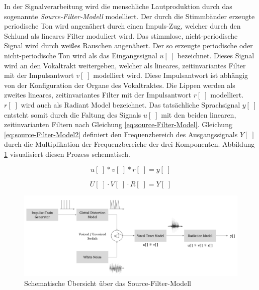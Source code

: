 In der Signalverarbeitung wird die menschliche Lautproduktion durch das sogenannte \emph{Source-Filter-Modell} modelliert. Der durch die Stimmbänder erzeugte periodische Ton wird angenähert durch einen Impuls-Zug, welcher durch den Schlund als lineares Filter moduliert wird. Das stimmlose, nicht-periodische Signal wird durch weißes Rauschen angenähert. Der so erzeugte periodische oder nicht-periodische Ton wird als das Eingangssignal $u[\;]$ bezeichnet. Dieses Signal wird an den Vokaltrakt weitergeben, welcher als lineares, zeitinvariantes Filter mit der Impulsantwort $v[\;]$ modelliert wird. Diese Impulsantwort ist abhängig von der Konfiguration der Organe des Vokaltraktes. Die Lippen werden als zweites lineares, zeitinvariantes Filter mit der Impulsantwort $r[\;]$ modelliert. $r[\;]$ wird auch als \glqq Radiant Model\grqq{} bezeichnet. Das tatsächliche Sprachsignal $y[\;]$ entsteht somit durch die Faltung des Signals $u[\;]$ mit den beiden linearen, zeitinvarianten Filtern nach Gleichung \ref{eq:source-Filter-Model}. Gleichung \ref{eq:source-Filter-Model2} definiert den Frequenzbereich des Ausgangssignals $Y[\;]$ durch die Multiplikation der Frequenzbereiche der drei Komponenten. Abbildung \ref{img:source-filter-model} visualisiert diesen Prozess schematisch.\cite[S. 62 - 63]{cryModel} \cite{speechProduction}

\begin{equation}
u[\;] * v[\;] * r[\;] = y[\;] 
\label{eq:source-Filter-Model}
\end{equation}

\begin{equation}
U[\;] \cdot V[\;] \cdot R[\;] = Y[\;] 
\label{eq:source-Filter-Model2}
\end{equation}

\begin{figure}[H]
	\centering
	\includegraphics[width=1\textwidth]{bilder/source-filter-model.png}
	\caption[Schematische Übersicht über das Source-Filter-Modell]{Schematische Übersicht über das Source-Filter-Modell \cite[nach \emph{Source estimation}, S. 17]{ricardo_ceps}}
	\label{img:source-filter-model}
\end{figure}	

